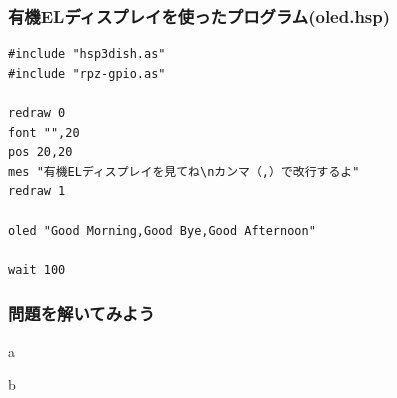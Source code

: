 \begin{frame}[fragile]
    \frametitle{有機ELディスプレイを使ったプログラム(oled.hsp)}
\begin{lstlisting}
#include "hsp3dish.as"
#include "rpz-gpio.as"

redraw 0
font "",20
pos 20,20
mes "有機ELディスプレイを見てね\nカンマ（,）で改行するよ"
redraw 1

oled "Good Morning,Good Bye,Good Afternoon"

wait 100
\end{lstlisting}
\end{frame}

\begin{frame}[fragile]
    \frametitle{問題を解いてみよう}
    \begin{description}
        \item a
        \item b
    \end{description}
\end{frame}